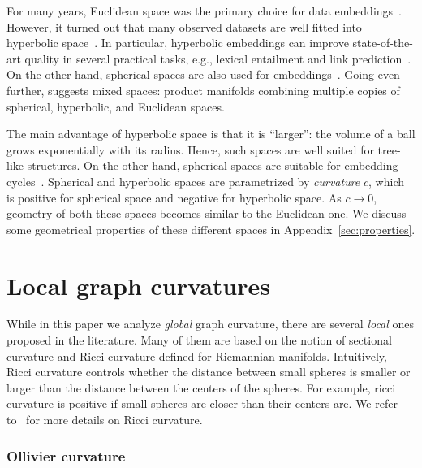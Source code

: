 \documentclass[runningheads]{llncs}
\newcommand{\ch}[1]{{\color{red} #1}}
\begin{document}
For many years, Euclidean space was the primary choice for data embeddings~\cite{goyal2018graph}. However, it turned out that many observed datasets are well fitted into hyperbolic space~\cite{krioukov2010hyperbolic}. In particular, hyperbolic embeddings can improve state-of-the-art quality in several practical tasks, e.g., lexical entailment and link prediction~\cite{nickel2017poincare}. On the other hand, spherical spaces are also used for embeddings~\cite{liu2017sphereface}. Going even further, \cite{gu2019learning} suggests mixed spaces: product manifolds combining multiple copies of spherical, hyperbolic, and Euclidean spaces. 

The main advantage of hyperbolic space is that it is ``larger'': the volume of a ball grows exponentially with its radius. Hence, such spaces are well suited for tree-like structures. On the other hand, spherical spaces are suitable for embedding cycles~\cite{gu2019learning}. Spherical and hyperbolic spaces are parametrized by \textit{curvature} $c$, which is positive for spherical space and negative for hyperbolic space. As $c \to 0$, geometry of both these spaces becomes similar to the Euclidean one. We discuss some geometrical properties of these different spaces in Appendix~\ref{sec:properties}.


\section{Local graph curvatures}

While in this paper we \ch{analyze \textit{global}} graph curvature, there are several \textit{local} ones proposed in the literature. Many of them are based on the notion of sectional curvature and Ricci curvature defined for Riemannian manifolds. Intuitively, Ricci curvature controls whether the distance between small spheres is smaller or larger than the distance between the centers of the spheres. \ch{For example, ricci} curvature is positive if small spheres are closer than their centers are. We refer to~\cite{jost2009geometry,oneill1983semiriemannian} for more details on Ricci curvature.

\subsubsection{Ollivier curvature}
\end{document}
